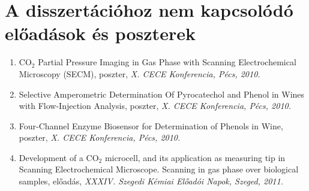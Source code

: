 \documentclass[11pt,a4paper,roman]{article}
\begin{document}
\section{A disszertációhoz nem kapcsolódó előadások és poszterek}
\begin{enumerate}
\item CO$_2$ Partial Pressure Imaging in Gas Phase with Scanning Electrochemical Microscopy (SECM), poszter, \emph{X. CECE Konferencia, Pécs, 2010.}

\item Selective Amperometric Determination Of Pyrocatechol and Phenol in Wines with Flow-Injection Analysis, poszter, \emph{X. CECE Konferencia, Pécs, 2010.}

\item Four-Channel Enzyme Biosensor for Determination of Phenols in Wine, poszter, \emph{X. CECE Konferencia, Pécs, 2010.}

\item Development of a CO$_2$ microcell, and its application as measuring tip in Scanning Electrochemical Microscope. Scanning in gas phase over biological samples, előadás, \emph{XXXIV. Szegedi Kémiai Előadói Napok, Szeged, 2011.}
\end{enumerate}
\end{document}
